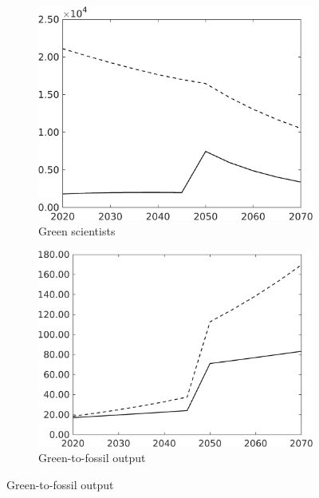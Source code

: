 \begin{figure}[h!!!]
\begin{subfigure}[]{0.4\textwidth}
	\end{subfigure}
	\begin{subfigure}[]{0.4\textwidth}
		\caption{Green scientists}
		\includegraphics[width=1\textwidth]{../../codding_model/own_basedOnFried/optimalPol_010922_revision/figures/all_13Sept22_Tplus30/sg_PercentageLFDyn_Target_regime4_knspil0_spillover0_noskill0_sep0_xgrowth0_PV1_etaa0.79_lgd0.png}
	\end{subfigure}
	\begin{subfigure}[]{0.4\textwidth}
		\caption{Green-to-fossil output}
		\includegraphics[width=1\textwidth]{../../codding_model/own_basedOnFried/optimalPol_010922_revision/figures/all_13Sept22_Tplus30/GFF_PercentageLFDyn_Target_regime4_knspil0_spillover0_noskill0_sep0_xgrowth0_PV1_etaa0.79_lgd0.png}

\end{subfigure}
\end{figure}
